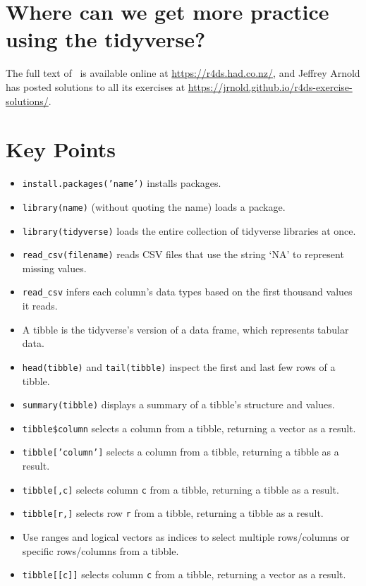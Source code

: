 \section{Where can we get more practice using the tidyverse?}

The full text of~\cite{Wick2017} is available online at \url{https://r4ds.had.co.nz/},
and Jeffrey Arnold has posted solutions to all its exercises at \url{https://jrnold.github.io/r4ds-exercise-solutions/}.

\section{Key Points}

\begin{itemize}
\item
  \texttt{install.packages('name')} installs packages.
\item
  \texttt{library(name)} (without quoting the name) loads a package.
\item
  \texttt{library(tidyverse)} loads the entire collection of tidyverse libraries at once.
\item
  \texttt{read\_csv(filename)} reads CSV files that use the string `NA' to represent missing values.
\item
  \texttt{read\_csv} infers each column's data types based on the first thousand values it reads.
\item
  A tibble is the tidyverse's version of a data frame, which represents tabular data.
\item
  \texttt{head(tibble)} and \texttt{tail(tibble)} inspect the first and last few rows of a tibble.
\item
  \texttt{summary(tibble)} displays a summary of a tibble's structure and values.
\item
  \texttt{tibble\$column} selects a column from a tibble, returning a vector as a result.
\item
  \texttt{tibble['column']} selects a column from a tibble, returning a tibble as a result.
\item
  \texttt{tibble[,c]} selects column \texttt{c} from a tibble, returning a tibble as a result.
\item
  \texttt{tibble[r,]} selects row \texttt{r} from a tibble, returning a tibble as a result.
\item
  Use ranges and logical vectors as indices to select multiple rows/columns or specific rows/columns from a tibble.
\item
  \texttt{tibble[[c]]} selects column \texttt{c} from a tibble, returning a vector as a result.

\end{itemize}
